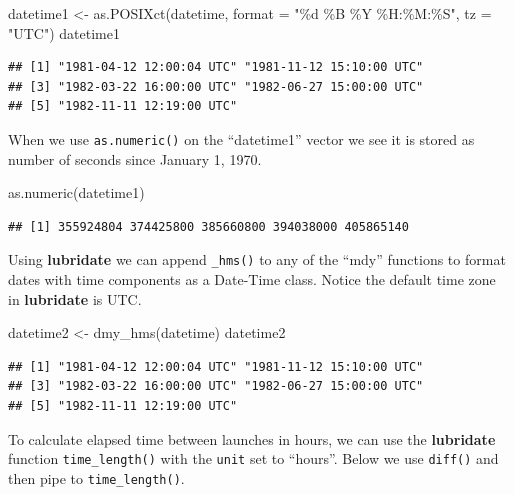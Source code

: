 \documentclass[
]{book}
\newenvironment{Shaded}{\begin{snugshade}}{\end{snugshade}}
\newcommand{\AttributeTok}[1]{\textcolor[rgb]{0.77,0.63,0.00}{#1}}
\newcommand{\FunctionTok}[1]{\textcolor[rgb]{0.00,0.00,0.00}{#1}}
\newcommand{\NormalTok}[1]{#1}
\newcommand{\OtherTok}[1]{\textcolor[rgb]{0.56,0.35,0.01}{#1}}
\newcommand{\StringTok}[1]{\textcolor[rgb]{0.31,0.60,0.02}{#1}}
\begin{document}
\begin{Shaded}
\begin{Highlighting}[]
\NormalTok{datetime1 }\OtherTok{\textless{}{-}} \FunctionTok{as.POSIXct}\NormalTok{(datetime, }
                        \AttributeTok{format =} \StringTok{"\%d \%B \%Y \%H:\%M:\%S"}\NormalTok{, }
                        \AttributeTok{tz =} \StringTok{"UTC"}\NormalTok{)}
\NormalTok{datetime1}
\end{Highlighting}
\end{Shaded}

\begin{verbatim}
## [1] "1981-04-12 12:00:04 UTC" "1981-11-12 15:10:00 UTC"
## [3] "1982-03-22 16:00:00 UTC" "1982-06-27 15:00:00 UTC"
## [5] "1982-11-11 12:19:00 UTC"
\end{verbatim}

When we use \texttt{as.numeric()} on the ``datetime1'' vector we see it is stored as number of seconds since January 1, 1970.

\begin{Shaded}
\begin{Highlighting}[]
\FunctionTok{as.numeric}\NormalTok{(datetime1)}
\end{Highlighting}
\end{Shaded}

\begin{verbatim}
## [1] 355924804 374425800 385660800 394038000 405865140
\end{verbatim}

Using \textbf{lubridate} we can append \texttt{\_hms()} to any of the ``mdy'' functions to format dates with time components as a Date-Time class. Notice the default time zone in \textbf{lubridate} is UTC.

\begin{Shaded}
\begin{Highlighting}[]
\NormalTok{datetime2 }\OtherTok{\textless{}{-}} \FunctionTok{dmy\_hms}\NormalTok{(datetime)}
\NormalTok{datetime2}
\end{Highlighting}
\end{Shaded}

\begin{verbatim}
## [1] "1981-04-12 12:00:04 UTC" "1981-11-12 15:10:00 UTC"
## [3] "1982-03-22 16:00:00 UTC" "1982-06-27 15:00:00 UTC"
## [5] "1982-11-11 12:19:00 UTC"
\end{verbatim}

To calculate elapsed time between launches in hours, we can use the \textbf{lubridate} function \texttt{time\_length()} with the \texttt{unit} set to ``hours''. Below we use \texttt{diff()} and then pipe to \texttt{time\_length()}.
\end{document}
